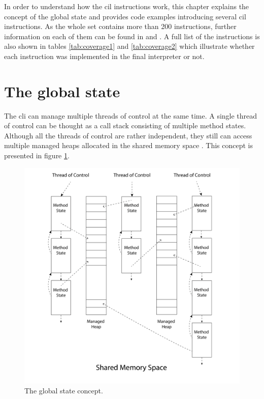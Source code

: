\documentclass[declaration,shortabstract,english,mgr]{iithesis}
\begin{document}
In order to understand how the \acrshort{cil} instructions work, this chapter explains the concept of the global state and provides code examples introducing several \acrshort{cil} instructions. As the whole set contains more than 200 instructions, further information on each of them can be found in \cite{ecmaStandard} and \cite{isoStandard}. A full list of the instructions is also shown in tables \ref{tab:coverage1} and \ref{tab:coverage2} which illustrate whether each instruction was implemented in the final interpreter or not.

\section{The global state}
\label{sec:global_state}

The \acrshort{cli} can manage multiple threads of control at the same time. A single thread of control can be thought as a call stack consisting of multiple method states. Although all the threads of control are rather independent, they still can access multiple managed heaps allocated in the shared memory space \cite{ecmaStandard}. This concept is presented in figure \ref{fig:global_state}.

\begin{figure}
	\includegraphics[width=1\textwidth]{global_state.png}
    \centering
    \caption{The global state concept.}
    \label{fig:global_state}
\end{figure}
\end{document}
